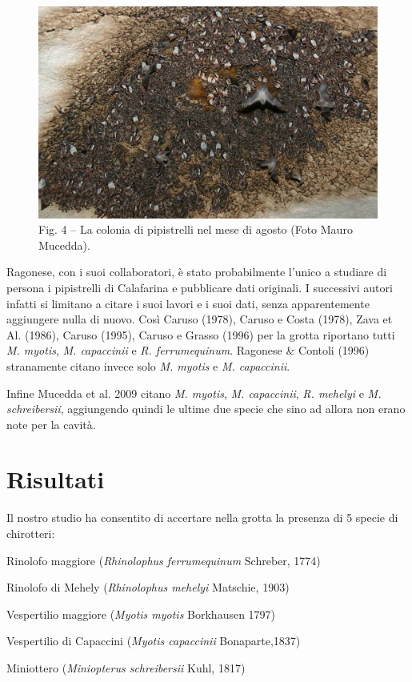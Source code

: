 \begin{multicols}{2}
\begin{figure}[t] %
  \centering\small
  \includegraphics[width=\linewidth]{abstracts/extended_abstracts/C018_Figure4.png}
  \caption*{Fig. 4 – La colonia di pipistrelli nel mese di agosto (Foto Mauro Mucedda).}
\end{figure}

Ragonese, con i suoi collaboratori, è stato probabilmente l’unico a studiare di persona i pipistrelli di Calafarina e pubblicare dati originali. I successivi autori infatti si limitano a citare i suoi lavori e i suoi dati, senza apparentemente aggiungere nulla di nuovo. Così Caruso (1978), Caruso e Costa (1978), Zava et Al. (1986), Caruso (1995), Caruso e Grasso (1996) per la grotta riportano tutti \emph{M. myotis}, \emph{M. capaccinii} e \emph{R. ferrumequinum}. Ragonese \& Contoli (1996) stranamente citano invece solo \emph{M. myotis} e \emph{M. capaccinii}.

Infine Mucedda et al. 2009 citano \emph{M. myotis}, \emph{M. capaccinii}, \emph{R. mehelyi} e \emph{M. schreibersii}, aggiungendo quindi le ultime due specie che sino ad allora non erano note per la cavità.

\section*{Risultati} 
Il nostro studio ha consentito di accertare nella grotta la presenza di 5 specie di chirotteri:
\begin{compactitem}
\item Rinolofo maggiore (\emph{Rhinolophus ferrumequinum} Schreber, 1774)
\item Rinolofo di Mehely (\emph{Rhinolophus mehelyi} Matschie, 1903)
\item Vespertilio maggiore (\emph{Myotis myotis} Borkhausen 1797)
\item Vespertilio di Capaccini (\emph{Myotis capaccinii} Bonaparte,1837)
\item Miniottero (\emph{Miniopterus schreibersii} Kuhl, 1817)
\end{compactitem}


\end{multicols}

